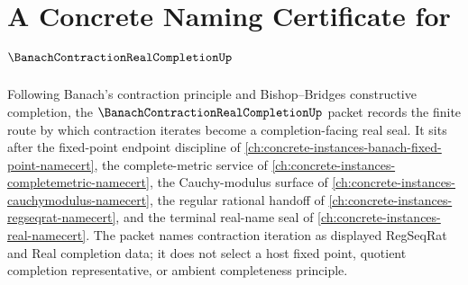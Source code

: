 \chapter{A Concrete Naming Certificate for $\BanachContractionRealCompletionUp$}
\label{ch:concrete-instances-banach-contraction-real-completion-namecert}

Following Banach's contraction principle and Bishop--Bridges constructive completion, the $\BanachContractionRealCompletionUp$ packet records the finite route by which contraction iterates become a completion-facing real seal. It sits after the fixed-point endpoint discipline of \autoref{ch:concrete-instances-banach-fixed-point-namecert}, the complete-metric service of \autoref{ch:concrete-instances-completemetric-namecert}, the Cauchy-modulus surface of \autoref{ch:concrete-instances-cauchymodulus-namecert}, the regular rational handoff of \autoref{ch:concrete-instances-regseqrat-namecert}, and the terminal real-name seal of \autoref{ch:concrete-instances-real-namecert}. The packet names contraction iteration as displayed RegSeqRat and Real completion data; it does not select a host fixed point, quotient completion representative, or ambient completeness principle.


